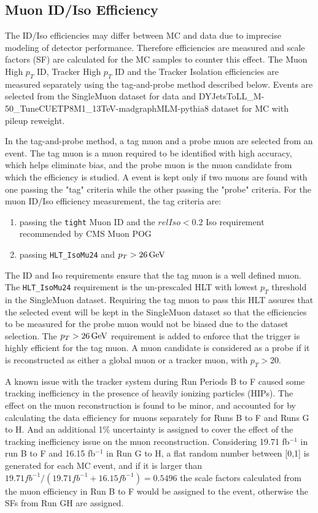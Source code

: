 \subsection{Muon ID/Iso Efficiency}
The ID/Iso efficiencies may differ between MC and data due to imprecise modeling of detector performance. Therefore efficiencies are measured and scale factors (SF) are calculated for the MC samples to counter this effect. The Muon High $p_T$ ID, Tracker High $p_T$ ID and the Tracker Isolation efficiencies are measured separately using the tag-and-probe method described below. Events are selected from the SingleMuon dataset for data and DYJetsToLL\_M-50\_TuneCUETP8M1\_13TeV-madgraphMLM-pythia8 dataset for MC with pileup reweight. 

\vspace{0.3cm}
In the tag-and-probe method, a tag muon and a probe muon are selected from an event. The tag muon is a muon required to be identified with high accuracy, which helps eliminate bias, and the probe muon is the muon candidate from which the efficiency is studied. A event is kept only if two muons are found with one passing the "tag" criteria while the other passing the "probe" criteria. For the muon ID/Iso efficiency measurement, the tag criteria are:
\begin{enumerate}
\item passing the \texttt{tight} Muon ID and the $relIso<0.2$ Iso requirement recommended by CMS Muon POG
\item passing \texttt{HLT\_IsoMu24} and $p_T > 26\,\text{Ge\hspace{-.08em}V}$
\end{enumerate}

The ID and Iso requirements ensure that the tag muon is a well defined muon. The \texttt{HLT\_IsoMu24} requirement is the un-prescaled HLT with lowest $p_T$ threshold in the SingleMuon dataset. Requiring the tag muon to pass this HLT assures that the selected event will be kept in the SingleMuon dataset so that the efficiencies to be measured for the probe muon would not be biased due to the dataset selection. The $p_T > 26\,\text{Ge\hspace{-.08em}V}$ requirement is added to enforce that the trigger is highly efficient for the tag muon. A muon candidate is considered as a probe if it is reconstructed as either a global muon or a tracker muon, with $p_T > 20$\GeV.

\vspace{0.3cm}
A known issue with the tracker system during Run Periods B to F caused some tracking inefficiency in the presence of heavily ionizing particles (HIPs). The effect on the muon reconstruction is found to be minor, and accounted for by calculating the data efficiency for muons separately for Runs B to F and Runs G to H. And an additional 1\% uncertainty is assigned to cover the effect of the tracking inefficiency issue on the muon reconstruction. Considering 19.71 fb$^{-1}$ in run B to F and 16.15 fb$^{-1}$ in Run G to H, a flat random number between [0,1] is generated for each MC event, and if it is larger than $19.71 fb^{-1}/(19.71 fb^{-1}+16.15 fb^{-1})=0.5496$ the scale factors calculated from the muon efficiency in Run B to F would be assigned to the event, otherwise the SFs from Run GH are assigned.

